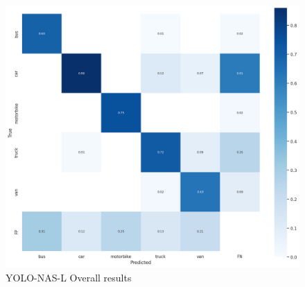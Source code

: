 \begin{figure}[H]
    \centering
    \includegraphics[width=\linewidth]{tex/img/L-confusion_matrix.png}
    \caption{YOLO-NAS-L Overall results }
    \label{fig:ConfusionMatrixY-N-S}
\end{figure}

